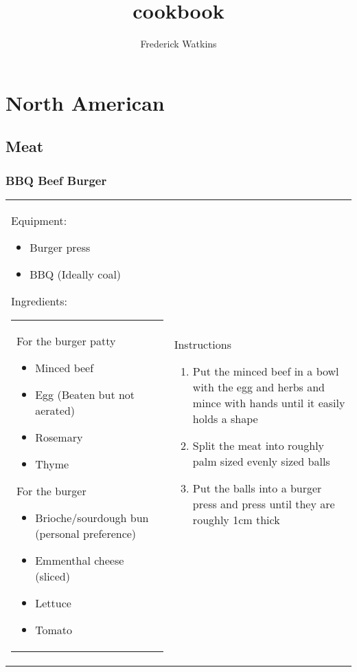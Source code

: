 \documentclass[a4paper]{book}
\title{cookbook}
\author{Frederick Watkins}
\begin{document}

\tableofcontents

\chapter{North American}

\section{Meat}

\subsection{BBQ Beef Burger}

\begin{tabularx}{\linewidth}{*{2}{ X }}
        Equipment:

        {\begin{itemize}
            \item Burger press
            \item BBQ (Ideally coal)
        \end{itemize}}
        Ingredients:
        {\begin{tabular}{p{\linewidth}}
        For the burger patty
        {\begin{itemize}
            \item Minced beef
            \item Egg (Beaten but not aerated)
            \item Rosemary
            \item Thyme
        \end{itemize}}
        For the burger
        {\begin{itemize}
            \item Brioche/sourdough bun (personal preference)
            \item Emmenthal cheese (sliced)
            \item Lettuce
            \item Tomato
        \end{itemize}}
    \end{tabular}}
    &
    Instructions
    {\begin{enumerate}
        \item 
            Put the minced beef in a bowl with the egg and herbs and mince with
            hands until it easily holds a shape
        \item
            Split the meat into roughly palm sized evenly sized balls
        \item
            Put the balls into a burger press and press until they are roughly
            1cm thick
    \end{enumerate}}\\

\end{tabularx}
\end{document}
